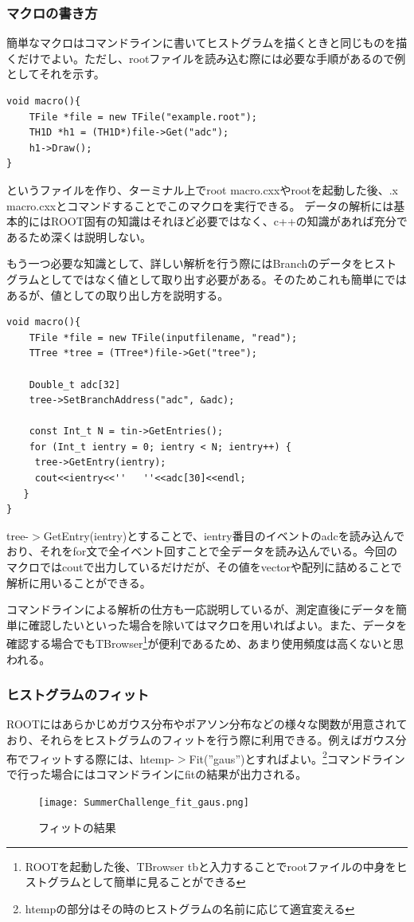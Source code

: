 \documentclass[uplatex,10pt,a4j]{jsarticle}
\begin{document}
\subsubsection{マクロの書き方}
簡単なマクロはコマンドラインに書いてヒストグラムを描くときと同じものを描くだけでよい。ただし、rootファイルを読み込む際には必要な手順があるので例としてそれを示す。
\begin{lstlisting}[basicstyle=\ttfamily\footnotesize, frame=single]
void macro(){
	TFile *file = new TFile("example.root");
	TH1D *h1 = (TH1D*)file->Get("adc");
	h1->Draw();
}
 \end{lstlisting}
というファイルを作り、ターミナル上でroot macro.cxxやrootを起動した後、.x macro.cxxとコマンドすることでこのマクロを実行できる。
データの解析には基本的にはROOT固有の知識はそれほど必要ではなく、c++の知識があれば充分であるため深くは説明しない。

もう一つ必要な知識として、詳しい解析を行う際にはBranchのデータをヒストグラムとしてではなく値として取り出す必要がある。そのためこれも簡単にではあるが、値としての取り出し方を説明する。

\begin{lstlisting}
void macro(){
    TFile *file = new TFile(inputfilename, "read"); 
    TTree *tree = (TTree*)file->Get("tree");
 
    Double_t adc[32]
    tree->SetBranchAddress("adc", &adc);
 
    const Int_t N = tin->GetEntries();
    for (Int_t ientry = 0; ientry < N; ientry++) {
     tree->GetEntry(ientry);    
     cout<<ientry<<''   ''<<adc[30]<<endl;
   }
}
 \end{lstlisting}

tree-$>$GetEntry(ientry)とすることで、ientry番目のイベントのadcを読み込んでおり、それをfor文で全イベント回すことで全データを読み込んでいる。今回のマクロではcoutで出力しているだけだが、その値をvectorや配列に詰めることで解析に用いることができる。

コマンドラインによる解析の仕方も一応説明しているが、測定直後にデータを簡単に確認したいといった場合を除いてはマクロを用いればよい。また、データを確認する場合でもTBrowser\footnote{ROOTを起動した後、TBrowser tbと入力することでrootファイルの中身をヒストグラムとして簡単に見ることができる}が便利であるため、あまり使用頻度は高くないと思われる。

\subsubsection{ヒストグラムのフィット}
ROOTにはあらかじめガウス分布やポアソン分布などの様々な関数が用意されており、それらをヒストグラムのフィットを行う際に利用できる。例えばガウス分布でフィットする際には、htemp-$>$Fit(''gaus'')とすればよい。\footnote{htempの部分はその時のヒストグラムの名前に応じて適宜変える}コマンドラインで行った場合にはコマンドラインにfitの結果が出力される。
\begin{figure}[h]
  \begin{center}
    \texttt{[image: SummerChallenge\_fit\_gaus.png]}
    \caption{フィットの結果}
    \label{fig:fit_gaus}
  \end{center}
\end{figure}
\end{document}
